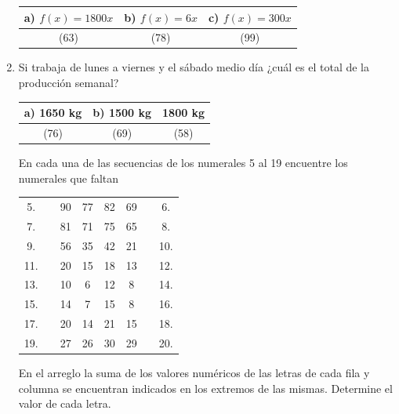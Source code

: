 \documentclass[letterpaper,11pt,twoside]{article}
\begin{document}
\begin{multicols}{2}
\begin{enumerate}
\begin{center}
\begin{tabular}{|c|c|c|}
\hline 
a) $f(x)=1800x$ & b) $f(x)=6x$ & c) $f(x)=300x$ \\ 
\hline 
(63) & (78) & (99) \\ 
\hline 
\end{tabular} 
\end{center}
\item Si trabaja de lunes a viernes y el sábado medio día ¿cuál es el total de la producción semanal?
\begin{center}
\begin{tabular}{|c|c|c|}
\hline 
a) 1650 kg & b) 1500 kg & 1800 kg \\ 
\hline 
(76) & (69) & (58) \\ 
\hline 
\end{tabular} 
\end{center}
En cada una de las secuencias de los numerales 5 al 19 encuentre los numerales que faltan
\begin{center}
\begin{tabular}{c|c|c|c|c|c|c|c}
\cline{2-7} 
5. & \hspace*{20pt} & 90 & 77 & 82 & 69 & \hspace*{20pt} & 6. \\ 
\cline{2-7} 
7. &  & 81 & 71 & 75 & 65 &  & 8. \\ 
\cline{2-7} 
9. &  & 56 & 35 & 42 & 21 &  & 10. \\ 
\cline{2-7} 
11. &  & 20 & 15 & 18 & 13 &  & 12. \\ 
\cline{2-7} 
13. &  & 10 & 6 & 12 & 8 &  & 14. \\ 
\cline{2-7} 
15. &  & 14 & 7 & 15 & 8 &  & 16. \\ 
\cline{2-7} 
17. &  & 20 & 14 & 21 & 15 &  & 18. \\ 
\cline{2-7} 
19. &  & 27 & 26 & 30 & 29 &  & 20. \\ 
\cline{2-7} 
\end{tabular} 
\end{center}
En el arreglo la suma de los valores numéricos de las letras de cada fila y columna se encuentran indicados en los extremos de las mismas. Determine el valor de cada letra.


\end{enumerate}
\end{multicols}
\end{document}
